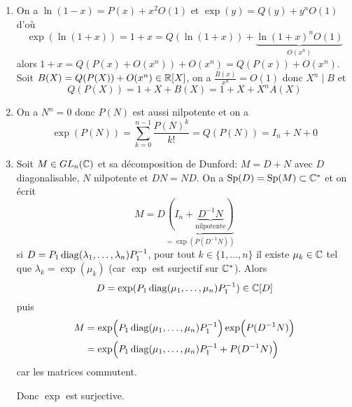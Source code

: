 \begin{solution}
	\phantom{}
	\begin{enumerate}
		\item On a $\ln(1-x)=P(x)+x^{2}O(1)$ et $\exp(y)=Q(y)+y^{n}O(1)$ d'où 
		$$\exp(\ln(1+x))=1+x=Q(\ln(1+x))+\underbrace{\ln(1+x)^{n}O(1)}_{O(x^{n})}$$
		alors $1+x=Q(P(x)+O(x^{n}))+O(x^{n})=Q(P(x))+O(x^{n})$. Soit $B(X)=Q(P(X))+O(x^{n})\in\mathbb{R}[X]$, on a $\frac{B(x)}{x^{n}}=O(1)$ donc $X^{n}\mid B$ et $$Q(P(X))=1+X+B(X)=1+X+X^{n}A(X)$$

		\item On a $N^{n}=0$ donc $P(N)$ est aussi nilpotente et on a 
		$$\exp(P(N))=\sum_{k=0}^{n-1}\frac{P(N)^{k}}{k!}=Q(P(N))=I_{n}+N+0$$

		\item Soit $M\in GL_{n}(\mathbb{C})$ et sa décomposition de Dunford: $M=D+N$ avec $D$ diagonalisable, $N$ nilpotente et $DN=ND$. On a $\operatorname{Sp}(D)=\operatorname{Sp}(M)\subset\mathbb{C}^{*}$ et on écrit
		$$M=D\underbrace{(I_{n}+\underbrace{D^{-1}N}_{\text{nilpotente}})}_{=\exp(P(D^{-1}N))}$$
		si $D=P_{1}\operatorname{diag}(\lambda_{1},\dots,\lambda_{n})P_{1}^{-1}$, pour tout $k\in\{1,\dots,n\}$ il existe $\mu_{k}\in\mathbb{C}$ tel que $\lambda_{k}=\exp(\mu_{k})$ (car $\exp$ est surjectif sur $\mathbb{C}^{*}$). Alors 
		$$
		D=\exp(P_{1}\operatorname{diag}(\mu_{1},\dots,\mu_{n})P_{1}^{-1})\in\mathbb{C}[D]
		$$
		puis 
		\begin{align*}
			M
			&=\exp\Bigl(P_{1}\operatorname{diag}(\mu_{1},\dots,\mu_{n})P_{1}^{-1}\Bigr)\exp\Bigl(P(D^{-1}N)\Bigr)\\
			&=\exp\Bigl(P_{1}\operatorname{diag}(\mu_{1},\dots,\mu_{n})P_{1}^{-1}+P(D^{-1}N)\Bigr)
		\end{align*}
		car les matrices commutent.

		Donc $\exp$ est surjective.
	\end{enumerate}
\end{solution}


